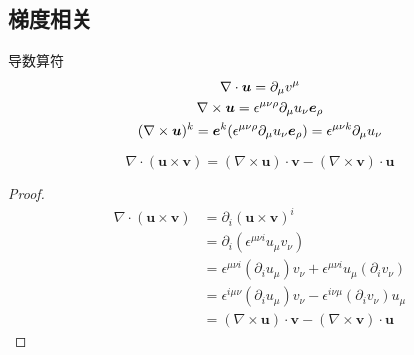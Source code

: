 \documentclass{mynote}
\begin{document}
\subsection{梯度相关}




\begin{define}{导数算符}
    \begin{gather*}
        \nabla \cdot \boldsymbol{u} = \partial_{\mu} v^{\mu} \\
        \nabla \times \boldsymbol{u} = \epsilon^{\mu \nu \rho} \partial_{\mu} u_{\nu} \boldsymbol{e}_{\rho} \\
        (\nabla \times \boldsymbol{u})^{k} = \boldsymbol{e}^k (\epsilon^{\mu \nu \rho} \partial_{\mu} u_{\nu} \boldsymbol{e}_{\rho}) = \epsilon^{\mu \nu k} \partial_{\mu} u_{\nu}
    \end{gather*}
\end{define}




\begin{proposition}
    \[
    \nabla \cdot (\bm{u} \times \bm{v}) = (\nabla \times \bm{u}) \cdot \bm{v} - (\nabla \times \bm{v}) \cdot \bm{u}
    \]
\end{proposition}
\begin{proof}
    \begin{align*}
        \nabla \cdot (\bm{u} \times \bm{v}) & = \partial_i (\bm{u} \times \bm{v})^i \\
        &= \partial_i ( \epsilon^{\mu \nu i} u_{\mu} v_{\nu} ) \\
        &= \epsilon^{\mu \nu i} (\partial_i u_{\mu}) v_{\nu} + \epsilon^{\mu \nu i} u_{\mu} (\partial_i v_{\nu}) \\
         &= \epsilon^{i \mu \nu } (\partial_i u_{\mu}) v_{\nu}  - \epsilon^{i \nu \mu } (\partial_i v_{\nu}) u_{\mu} \\
         &=  (\nabla \times \bm{u}) \cdot \bm{v} - (\nabla \times \bm{v}) \cdot \bm{u}
    \end{align*}
\end{proof}
\end{document}
